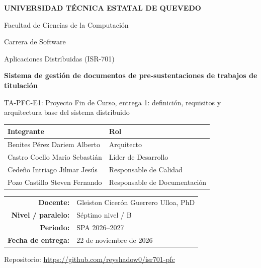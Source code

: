 \documentclass[11pt,a4paper]{article}
\newcommand{\codigoactividad}{TA-PFC-E1}
\newcommand{\nombreactividad}{Proyecto Fin de Curso, entrega 1: definición, requisitos y arquitectura base del sistema distribuido}
\newcommand{\nombreproyecto}{Sistema de gestión de documentos de pre-sustentaciones de trabajos de titulación}
\newcommand{\repositorio}{https://github.com/reyshadow0/isr701-pfc}
\newcommand{\fechaentrega}{22 de noviembre de 2026}
\begin{document}
\begin{titlepage}
  \centering
  {\large\bfseries UNIVERSIDAD TÉCNICA ESTATAL DE QUEVEDO\par}
  \vspace{0.3cm}
  {Facultad de Ciencias de la Computación\par}
  {Carrera de Software\par}
  \vspace{2cm}
  {\large Aplicaciones Distribuidas (ISR-701)\par}
  \vspace{1.2cm}
  {\Large\bfseries \nombreproyecto\par}
  \vspace{0.6cm}
  {\large \codigoactividad: \nombreactividad\par}
  \vfill
  \begin{tabular}{@{}ll@{}}
    \toprule
    \textbf{Integrante} & \textbf{Rol} \\
    \midrule
    Benites Pérez Dariem Alberto   & Arquitecto \\
    Castro Coello Mario Sebastián  & Líder de Desarrollo \\
    Cedeño Intriago Jilmar Jesús   & Responsable de Calidad \\
    Pozo Castillo Steven Fernando  & Responsable de Documentación \\
    \bottomrule
  \end{tabular}
  \par\vspace{1cm}
  \begin{tabular}{@{}rl@{}}
    \textbf{Docente:}          & Gleiston Cicerón Guerrero Ulloa, PhD \\
    \textbf{Nivel / paralelo:} & Séptimo nivel / B \\
    \textbf{Periodo:}          & SPA 2026--2027 \\
    \textbf{Fecha de entrega:} & \fechaentrega \\
  \end{tabular}
  \par\vspace{1cm}
  {\small Repositorio: \url{\repositorio}\par}
\end{titlepage}

\tableofcontents
\newpage

















\printbibliography[heading=bibintoc,title={Referencias}]
\end{document}
